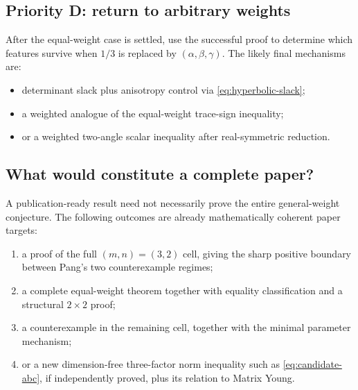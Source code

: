\subsection*{Priority D: return to arbitrary weights}
After the equal-weight case is settled, use the successful proof to determine which features survive when $1/3$ is replaced by $(\alpha,\beta,\gamma)$.  The likely final mechanisms are:
\begin{itemize}[leftmargin=2em]
\item determinant slack plus anisotropy control via \eqref{eq:hyperbolic-slack};
\item a weighted analogue of the equal-weight trace-sign inequality;
\item or a weighted two-angle scalar inequality after real-symmetric reduction.
\end{itemize}

\subsection{What would constitute a complete paper?}
A publication-ready result need not necessarily prove the entire general-weight conjecture.  The following outcomes are already mathematically coherent paper targets:
\begin{enumerate}[leftmargin=2.2em]
\item a proof of the full $(m,n)=(3,2)$ cell, giving the sharp positive boundary between Pang's two counterexample regimes;
\item a complete equal-weight theorem together with equality classification and a structural $2\times2$ proof;
\item a counterexample in the remaining cell, together with the minimal parameter mechanism;
\item or a new dimension-free three-factor norm inequality such as \eqref{eq:candidate-abc}, if independently proved, plus its relation to Matrix Young.
\end{enumerate}


